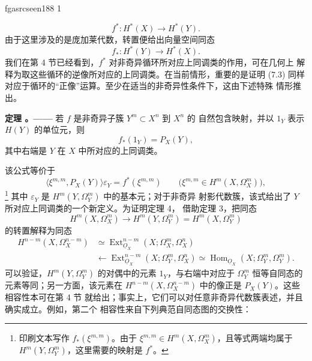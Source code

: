 \documentclass[12pt,twoside,openany]{book}
\numberwithin{equation}{section}
\newcommand{\fgaunitid}{unbound}
\newcommand{\src}[1]{%
  \phantomsection
  \hypertarget{src:\fgaunitid:#1}{}%
  \hypertarget{fga.\fgaunitid.p#1}{}%
  \ifcsname fgasrcseen#1\endcsname\else
    \expandafter\gdef\csname fgasrcseen#1\endcsname{1}%
    \hypertarget{src:#1}{}%
  \fi
  \marginpar{\raggedleft\footnotesize\sffamily #1}%
}
\newcommand{\Osh}{\underline{O}}
\newcommand{\fquote}[1]{“#1”}
\theoremstyle{plain}
\theoremstyle{definition}
\theoremstyle{remark}
\newcommand{\result}[2]{%
  \par\medskip\noindent\textbf{#1%
  \if\relax\detokenize{#2}\relax\else\space#2\fi。——}\enspace
}
\begin{document}
\src{188}
\begin{equation}\tag{7.2}
  f^{*}:H^{*}(X)\longrightarrow H^{*}(Y).
\end{equation}
由于这里涉及的是庞加莱代数，转置便给出向量空间同态
\begin{equation}\tag{7.3}
  f_{*}:H^{*}(Y)\longrightarrow H^{*}(X).
\end{equation}
我们在第 4 节已经看到，$f^{*}$ 对非奇异循环所对应上同调类的作用，可在几何上
解释为取这些循环的逆像所对应的上同调类。在当前情形，重要的是证明 (7.3)
同样对应于循环的\fquote{正像}运算。至少在适当的非奇异性条件下，这由下述特殊
情形推出。

\result{定理}{4} 若 $f$ 是非奇异子簇 $Y^{m}\subset X^{n}$ 到 $X^{n}$ 的
自然包含映射，并以 $1_Y$ 表示 $H(Y)$ 的单位元，则
\begin{equation}\tag{7.4}
  f_{*}(1_Y)=P_X(Y),
\end{equation}
其中右端是 $Y$ 在 $X$ 中所对应的上同调类。

该公式等价于
\begin{equation}\tag{7.4 bis}
  \bigl\langle\xi^{m,m},P_X(Y)\bigr\rangle\varepsilon_Y
  =f^{*}(\xi^{m,m})
  \qquad
  \bigl(\xi^{m,m}\in H^{m}(X,\Omega_X^{m})\bigr),
\end{equation}
\footnote{印刷文本写作 $f_{*}(\xi^{m,m})$。由于
$\xi^{m,m}\in H^{m}(X,\Omega_X^{m})$，且等式两端均属于
$H^{m}(Y,\Omega_Y^{m})$，这里需要的映射是 $f^{*}$。}
其中 $\varepsilon_Y$ 是 $H^{m}(Y,\Omega_Y^{m})$ 中的基本元；对于非奇异
射影代数簇，该式给出了 $Y$ 所对应上同调类的一个新定义。为证明定理 4，
借助定理 3，把同态
\[
  H^{m}(X,\Omega_X^{m})
  \longrightarrow H^{m}(Y,\Omega_Y^{m})
  =H^{m}(X,\Omega_Y^{m})
\]
的转置解释为同态
\begin{equation}\tag{7.5}
\begin{split}
  H^{n-m}(X,\Omega_X^{n-m})
  &\simeq
  \operatorname{Ext}_{\Osh_X}^{n-m}(X;\Omega_X^{m},\Omega_X^{n})\\
  &\longleftarrow
  \operatorname{Ext}_{\Osh_X}^{n-m}(X;\Omega_Y^{m},\Omega_X^{n})
  \simeq
  \operatorname{Hom}_{\Osh_X}(X;\Omega_Y^{m},\Omega_Y^{m}).
\end{split}
\end{equation}
可以验证，$H^{m}(Y,\Omega_Y^{m})$ 的对偶中的元素 $1_Y$，与右端中对应于
$\Omega_Y^{m}$ 恒等自同态的元素等同；另一方面，该元素在
$H^{n-m}(X,\Omega_X^{n-m})$ 中的像正是 $P_X(Y)$。这些相容性本可在第 4 节
就给出；事实上，它们可以对任意非奇异代数簇表述，并且确实成立。例如，第二个
相容性来自下列典范自同态图的交换性：
\end{document}
